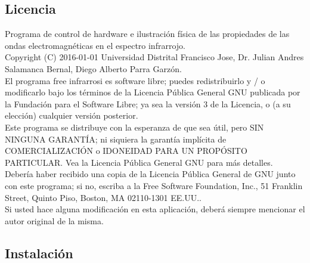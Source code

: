 \documentclass[12]{article}
\begin{document}
\begin{multicols}{2}
\subsection{Licencia}
Programa de control de hardware e ilustración física de las propiedades de las ondas electromagnéticas en el espectro infrarrojo.\\
Copyright (C) 2016-01-01  Universidad Distrital Francisco Jose, Dr. Julian Andres Salamanca Bernal, Diego Alberto Parra Garzón. \\
El programa free infrarrosi es software libre; puedes redistribuirlo y / o modificarlo bajo los términos de la Licencia Pública General GNU publicada por la Fundación para el Software Libre; ya sea 	la versión 3 de la Licencia, o (a su elección) cualquier versión posterior. \\
Este programa se distribuye con la esperanza de que sea útil, pero SIN NINGUNA GARANTÍA; ni siquiera la garantía implícita de COMERCIALIZACIÓN o IDONEIDAD PARA UN PROPÓSITO PARTICULAR. Vea la Licencia Pública General GNU para más detalles. \\
Debería haber recibido una copia de la Licencia Pública General de GNU junto con este programa; si no, escriba a la Free Software Foundation, Inc., 51 Franklin Street, Quinto Piso, Boston, MA 02110-1301 EE.UU..\\
Si usted hace alguna modificación en esta aplicación, deberá siempre mencionar el autor original de la misma.

\subsection{Instalación}







\end{multicols}
\end{document}
